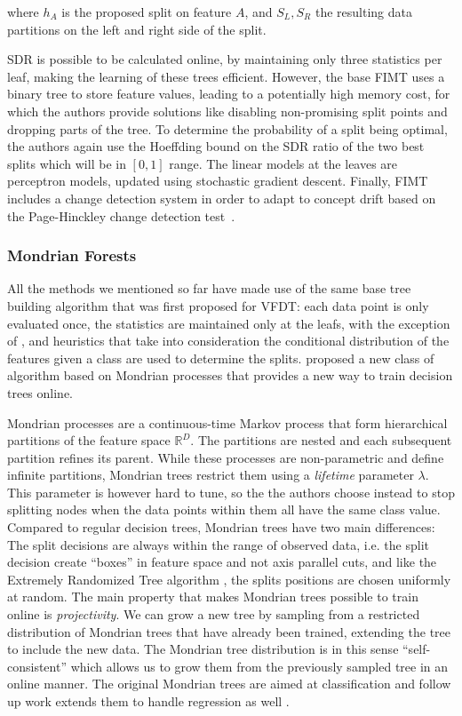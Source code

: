 \noindent
where $h_A$ is the proposed split on feature $A$, and $S_L, S_R$ the resulting
data partitions on the left and right side of the split.

SDR is possible to be calculated online, by maintaining only three statistics per leaf,
making the learning of these trees efficient. However, the base FIMT uses a binary tree
to store feature values, leading to a potentially high memory cost, for which
the authors provide solutions like disabling non-promising split points and dropping
parts of the tree. To determine the
probability of a split being optimal, the authors again use the Hoeffding bound
on the SDR ratio of the two best splits which will be in $[0, 1]$ range.
The linear models at the leaves are perceptron models, updated using stochastic
gradient descent.  Finally, FIMT includes a change detection system in order to
adapt to concept drift
based on the Page-Hinckley change detection test~\cite{ph-test, ph-test2}.


\subsubsection*{Mondrian Forests}

All the methods we mentioned so far have made use of the same base tree building
algorithm that was first proposed for VFDT: each data point is only evaluated once,
the statistics are maintained only at the leafs, with the exception of \cite{efdt},
and heuristics that take into consideration the conditional distribution of the
features given a class are used to determine the splits. \citet{mondrian-forests-original}
proposed a new class of algorithm based on Mondrian processes \cite{mondrian-process}
that provides a new way to train decision trees online.

Mondrian processes are a continuous-time
Markov process that form hierarchical partitions of the feature space $\mathbb{R}^D$.
The partitions are nested and each subsequent partition refines its parent. While
these processes are non-parametric and define infinite partitions, Mondrian trees
restrict them using a \emph{lifetime} parameter $\lambda$.
This parameter is however hard to tune,
so the the authors choose instead to stop splitting nodes when the data points
within them all have the same class value. Compared to regular decision trees,
Mondrian trees have two main differences: The split decisions are always within
the range of observed data, i.e. the split decision create ``boxes'' in feature
space and not axis parallel cuts, and like the Extremely Randomized Tree algorithm
\cite{ert}, the splits positions are chosen uniformly at random. The main property that makes Mondrian trees possible to train
online is \emph{projectivity}. We can grow a new tree by sampling from a restricted
distribution of Mondrian trees that have already been trained, extending the tree
to include the new data. The Mondrian tree distribution is in this sense ``self-consistent''
\cite{mondrian-forests-original} which allows us to grow them from the previously
sampled tree in an online manner. The original Mondrian trees are aimed at classification
and follow up work extends them to handle regression as well \cite{mondrian-forests-regression}.

